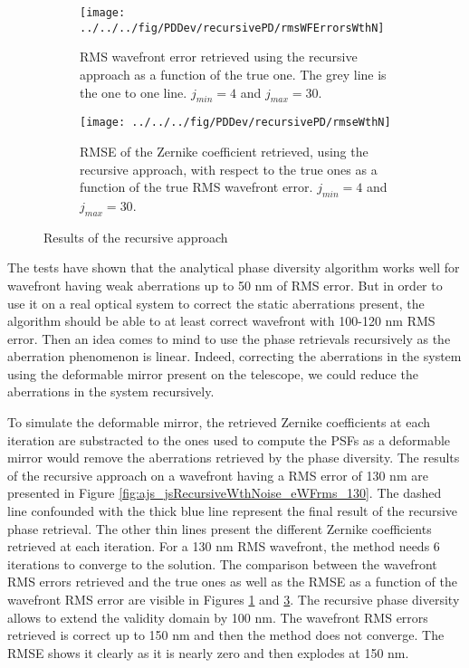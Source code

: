 \begin{figure}
\centering
    \begin{subfigure}{0.45\textwidth}
        \texttt{[image: ../../../fig/PDDev/recursivePD/rmsWFErrorsWthN]}
        \caption{RMS wavefront error retrieved using the recursive approach as a function of the true one. The grey line is the one to one line. $j_{min}=4$ and $j_{max}=30$.}
        \label{subfig:rmsWFErrorsWthN}
    \end{subfigure}
    \quad
    \begin{subfigure}{0.45\textwidth}
        \texttt{[image: ../../../fig/PDDev/recursivePD/rmseWthN]}
        \caption{RMSE of the Zernike coefficient retrieved, using the recursive approach, with respect to the true ones as a function of the true RMS wavefront error.  $j_{min}=4$ and $j_{max}=30$.}
        \label{subfig:rmseWthN}
    \end{subfigure}
    \decoRule
    \caption{Results of the recursive approach}
\end{figure}

The tests have shown that the analytical phase diversity algorithm works well for wavefront having weak aberrations up to 50 nm of RMS error. But in order to use it on a real optical system to correct the static aberrations present, the algorithm should be able to at least correct wavefront with 100-120 nm RMS error. Then an idea comes to mind to use the phase retrievals recursively as the aberration phenomenon is linear. Indeed, correcting the aberrations in the system  using the deformable mirror present on the telescope, we could reduce the aberrations in the system recursively.

To simulate the deformable mirror, the retrieved Zernike coefficients at each iteration are substracted to the ones used to compute the PSFs as a deformable mirror would remove the aberrations retrieved by the phase diversity. The results of the recursive approach on a wavefront having a RMS error of 130 nm are presented in Figure \ref{fig:ajs_jsRecursiveWthNoise_eWFrms_130}. The dashed line confounded with the thick blue line represent the final result of the recursive phase retrieval. The other thin lines present the different Zernike coefficients retrieved at each iteration. For a 130 nm RMS wavefront, the method needs 6 iterations to converge to the solution. The comparison between the wavefront RMS errors retrieved and the true ones as well as the RMSE as a function of the wavefront RMS error are visible in Figures \ref{subfig:rmsWFErrorsWthN} and \ref{subfig:rmseWthN}. The recursive phase diversity allows to extend the validity domain by 100 nm. The wavefront RMS errors retrieved is correct up to 150 nm and then the method does not converge. The RMSE shows it clearly as it is nearly zero and then explodes at 150 nm.

